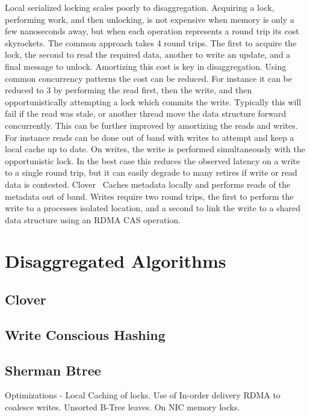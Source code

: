 Local serialized locking scales poorly to disaggregation. Acquiring a lock,
performing work, and then unlocking, is not expensive when memory is only a few
nanoseconds away, but when each operation represents a round trip its cost
skyrockets. The common approach takes 4 round trips. The first to acquire the
lock, the second to read the required data, another to write an update, and a
final message to unlock. Amortizing this cost is key in disaggregation. Using
common concurrency patterns the cost can be reduced. For instance it can be
reduced to 3 by performing the read first, then the write, and then
opportunistically attempting a lock which commits the write. Typically this will
fail if the read was stale, or another thread move the data structure forward
concurrently. This can be further improved by amortizing the reads and writes.
For instance reads can be done out of band with writes to attempt and keep a
local cache up to date. On writes, the write is performed simultaneously with
the opportunistic lock. In the best case this reduces the observed latency on a
write to a single round trip, but it can easily degrade to many retires if write
or read data is contested. Clover~\cite{clover} Caches metadata locally and
performs reads of the metadata out of band. Writes require two round trips, the
first to perform the write to a processes isolated location, and a second to
link the write to a shared data structure using an RDMA CAS operation.

\section{Disaggregated Algorithms}

\subsection{Clover}

\subsection{Write Conscious Hashing}

\subsection{Sherman Btree}

Optimizations - Local Caching of locks. Use of In-order delivery RDMA to
coalesce writes. Unsorted B-Tree leaves. On NIC memory locks.

